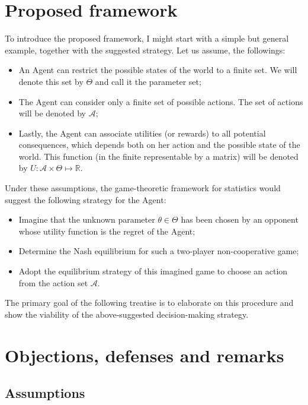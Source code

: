 \documentclass{article}
\begin{document}
\section*{Proposed framework}

To introduce the proposed framework, I might start with a simple but general example, together with the suggested strategy. Let us assume, the followings:

\begin{itemize}
    \item An Agent can restrict the possible states of the world to a finite set. We will denote this set by $\Theta$ and call it the parameter set;
    \item The Agent can consider only a finite set of possible actions. The set of actions will be denoted by $\mathcal{A}$;
    \item Lastly, the Agent can associate utilities (or rewards) to all potential consequences, which depends both on her action and the possible state of the world. This function (in the finite representable by a matrix) will be denoted by $U: \mathcal{A} \times \Theta \mapsto \mathbb{R}$.
\end{itemize}

Under these assumptions, the game-theoretic framework for statistics would suggest the following strategy for the Agent:

\begin{itemize}
    \item Imagine that the unknown parameter $\theta \in \Theta$ has been chosen by an opponent whose utility function is the regret of the Agent;
    \item Determine the Nash equilibrium for such a two-player non-cooperative game;
    \item Adopt the equilibrium strategy of this imagined game to choose an action from the action set $\mathcal{A}$.
\end{itemize}

The primary goal of the following treatise is to elaborate on this procedure and show the viability of the above-suggested decision-making strategy.


\section*{Objections, defenses and remarks}

\subsection*{Assumptions}
\end{document}
